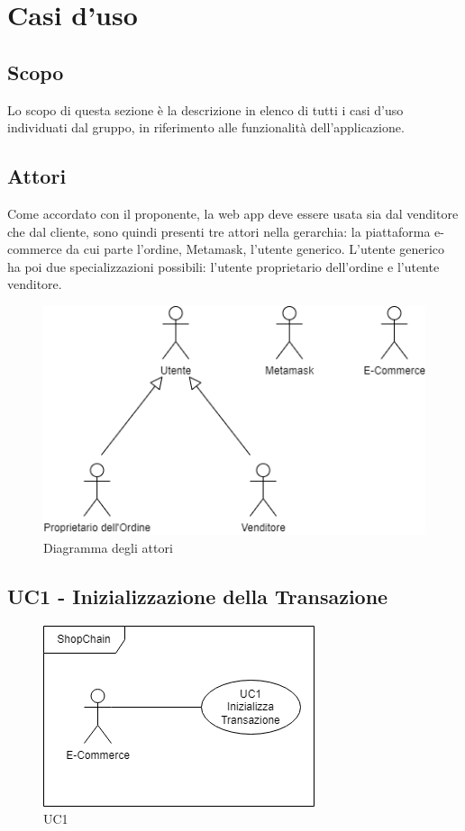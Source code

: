 \section{Casi d'uso} \label{section:casi_uso}

\subsection{Scopo}
Lo scopo di questa sezione è la descrizione in elenco di tutti i casi d'uso individuati dal gruppo, in
riferimento alle funzionalità dell'applicazione.

\subsection{Attori}
Come accordato con il proponente, la web app\glo{} deve essere usata sia dal venditore che dal cliente,
sono quindi presenti tre attori nella gerarchia: la piattaforma e-commerce\glo{} da cui parte l'ordine, Metamask\glo{}, l'utente generico.
L'utente generico ha poi due specializzazioni possibili: l'utente proprietario dell'ordine e l'utente venditore.

\begin{figure}[H]
    \centering
    \includegraphics[scale=0.7]{immagini/Attori.png}
    \caption{Diagramma degli attori}
\end{figure}

\subsection{UC1 - Inizializzazione della Transazione}\label{subsection: UC1}

\begin{figure}[H]
    \centering
    \includegraphics[scale=0.7]{immagini/UC1.png}
    \caption{UC1}
\end{figure}

